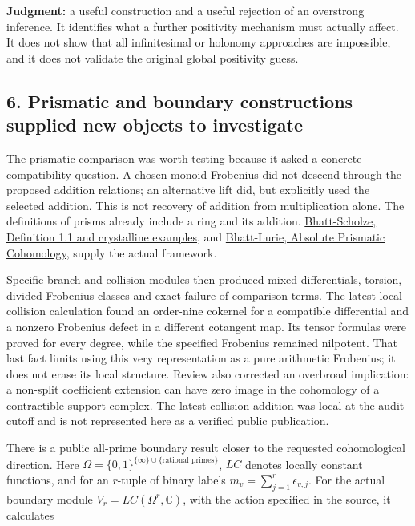 \documentclass[
  british,
  11pt,
  a4paper,
]{article}
\begin{document}
\textbf{Judgment:} a useful construction and a useful rejection of an
overstrong inference. It identifies what a further positivity mechanism
must actually affect. It does not show that all infinitesimal or
holonomy approaches are impossible, and it does not validate the
original global positivity guess.

\subsection{6. Prismatic and boundary constructions supplied new objects
to
investigate}\label{prismatic-and-boundary-constructions-supplied-new-objects-to-investigate}

The prismatic comparison was worth testing because it asked a concrete
compatibility question. A chosen monoid Frobenius did not descend
through the proposed addition relations; an alternative lift did, but
explicitly used the selected addition. This is not recovery of addition
from multiplication alone. The definitions of prisms already include a
ring and its addition.
\href{https://arxiv.org/abs/1905.08229v4}{Bhatt-Scholze, Definition 1.1
and crystalline examples}, and
\href{https://arxiv.org/abs/2201.06120v1}{Bhatt-Lurie, Absolute
Prismatic Cohomology}, supply the actual framework.

Specific branch and collision modules then produced mixed differentials,
torsion, divided-Frobenius classes and exact failure-of-comparison
terms. The latest local collision calculation found an order-nine
cokernel for a compatible differential and a nonzero Frobenius defect in
a different cotangent map. Its tensor formulas were proved for every
degree, while the specified Frobenius remained nilpotent. That last fact
limits using this very representation as a pure arithmetic Frobenius; it
does not erase its local structure. Review also corrected an overbroad
implication: a non-split coefficient extension can have zero image in
the cohomology of a contractible support complex. The latest collision
addition was local at the audit cutoff and is not represented here as a
verified public publication.

There is a public all-prime boundary result closer to the requested
cohomological direction. Here
\(\Omega=\{0,1\}^{\{\infty\}\cup\{\text{rational primes}\}}\), \(LC\)
denotes locally constant functions, and for an \(r\)-tuple of binary
labels \(m_v=\sum_{j=1}^r\epsilon_{v,j}\). For the actual boundary
module \(V_r=LC(\Omega^r,\mathbb C)\), with the action specified in the
source, it calculates
\end{document}
